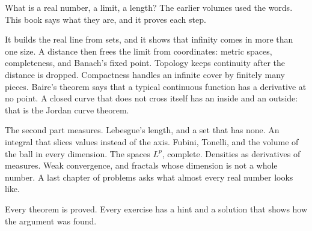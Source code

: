 What is a real number, a limit, a length? The earlier volumes used the words. This book says what they are, and it proves each step.

It builds the real line from sets, and it shows that infinity comes in more than one size. A distance then frees the limit from coordinates: metric spaces, completeness, and Banach's fixed point. Topology keeps continuity after the distance is dropped. Compactness handles an infinite cover by finitely many pieces. Baire's theorem says that a typical continuous function has a derivative at no point. A closed curve that does not cross itself has an inside and an outside: that is the Jordan curve theorem.

The second part measures. Lebesgue's length, and a set that has none. An integral that slices values instead of the axis. Fubini, Tonelli, and the volume of the ball in every dimension. The spaces \(L^p\), complete. Densities as derivatives of measures. Weak convergence, and fractals whose dimension is not a whole number. A last chapter of problems asks what almost every real number looks like.

Every theorem is proved. Every exercise has a hint and a solution that shows how the argument was found.
